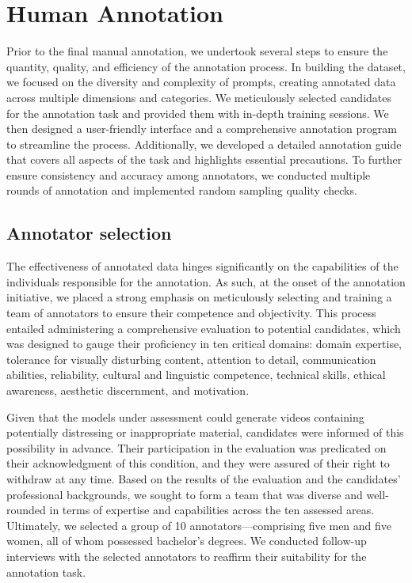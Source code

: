 
\clearpage
\setcounter{page}{1}
\maketitlesupplementary

\appendix



\section{Human Annotation}

Prior to the final manual annotation, we undertook several steps to ensure the quantity, quality, and efficiency of the annotation process. In building the dataset, we focused on the diversity and complexity of prompts, creating annotated data across multiple dimensions and categories. We meticulously selected candidates for the annotation task and provided them with in-depth training sessions. We then designed a user-friendly interface and a comprehensive annotation program to streamline the process. Additionally, we developed a detailed annotation guide that covers all aspects of the task and highlights essential precautions. To further ensure consistency and accuracy among annotators, we conducted multiple rounds of annotation and implemented random sampling quality checks.
\subsection{Annotator selection}
The effectiveness of annotated data hinges significantly on the capabilities of the individuals responsible for the annotation. As such, at the onset of the annotation initiative, we placed a strong emphasis on meticulously selecting and training a team of annotators to ensure their competence and objectivity. This process entailed administering a comprehensive evaluation to potential candidates, which was designed to gauge their proficiency in ten critical domains: domain expertise, tolerance for visually disturbing content, attention to detail, communication abilities, reliability, cultural and linguistic competence, technical skills, ethical awareness, aesthetic discernment, and motivation.

Given that the models under assessment could generate videos containing potentially distressing or inappropriate material, candidates were informed of this possibility in advance. Their participation in the evaluation was predicated on their acknowledgment of this condition, and they were assured of their right to withdraw at any time.
Based on the results of the evaluation and the candidates' professional backgrounds, we sought to form a team that was diverse and well-rounded in terms of expertise and capabilities across the ten assessed areas. Ultimately, we selected a group of 10 annotators—comprising five men and five women, all of whom possessed bachelor's degrees. We conducted follow-up interviews with the selected annotators to reaffirm their suitability for the annotation task.
